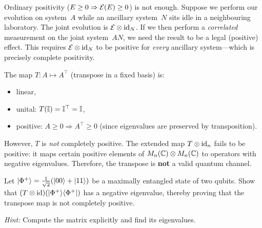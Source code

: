 Ordinary positivity ($E \geq 0 \Rightarrow \mathcal{E}(E) \geq 0$) is not
enough.  Suppose we perform our evolution on system~$A$ while an
ancillary system~$N$ sits idle in a neighbouring laboratory.  The joint
evolution is $\mathcal{E} \otimes \operatorname{id}_N$.  If we then perform a \emph{correlated}
measurement on the joint system~$AN$, we need the result to be a legal
(positive) effect.  This requires $\mathcal{E} \otimes \operatorname{id}_N$ to be positive for
\emph{every} ancillary system---which is precisely complete positivity.

\begin{example}\label{ex:transpose}
  The map $T\colon A \mapsto A^\top$ (transpose in a fixed basis) is:
  \begin{itemize}
    \item linear,
    \item unital: $T(\mathbb{I}) = \mathbb{I}^\top = \mathbb{I}$,
    \item positive: $A \geq 0 \Rightarrow A^\top \geq 0$ (since
      eigenvalues are preserved by transposition).
  \end{itemize}
  However, $T$ is \emph{not} completely positive.  The extended map
  $T \otimes \operatorname{id}_n$ fails to be positive: it maps certain positive
  elements of $M_{n}(\mathbb{C}) \otimes M_{n}(\mathbb{C})$ to operators with negative
  eigenvalues.  Therefore, the transpose is \textbf{not} a valid
  quantum channel.
\end{example}

\begin{exercise}\label{ex:transpose-not-cp}
  Let $\lvert \Phi^+ \rangle = \tfrac{1}{\sqrt{2}}(\lvert 00 \rangle + \lvert 11 \rangle)$ be a
  maximally entangled state of two qubits.  Show that
  $(T \otimes \operatorname{id})(\lvert \Phi^+ \rangle\langle \Phi^+ \rvert)$ has a negative eigenvalue,
  thereby proving that the transpose map is not completely positive.

  \emph{Hint:} Compute the matrix explicitly and find its eigenvalues.
\end{exercise}
